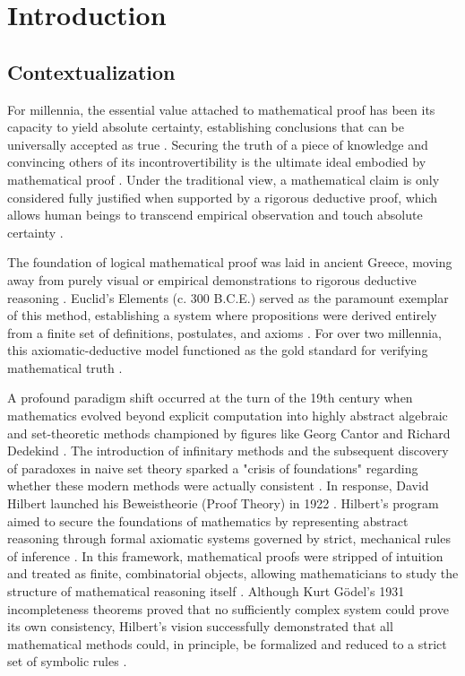 \chapter[Introduction]{Introduction}

\section{Contextualization}

For millennia, the essential value attached to mathematical proof has been its capacity to yield absolute certainty, establishing conclusions that can be universally accepted as true \cite{chemla_history_nodate}. Securing the truth of a piece of knowledge and convincing others of its incontrovertibility is the ultimate ideal embodied by mathematical proof \cite{chemla_history_nodate}. Under the traditional view, a mathematical claim is only considered fully justified when supported by a rigorous deductive proof, which allows human beings to transcend empirical observation and touch absolute certainty \cite{de_toffoli_proofs_2024}.

The foundation of logical mathematical proof was laid in ancient Greece, moving away from purely visual or empirical demonstrations to rigorous deductive reasoning \cite{hanna_proof_2012}. Euclid’s Elements (c. 300 B.C.E.) served as the paramount exemplar of this method, establishing a system where propositions were derived entirely from a finite set of definitions, postulates, and axioms \cite{hanna_proof_2012}. For over two millennia, this axiomatic-deductive model functioned as the gold standard for verifying mathematical truth \cite{hanna_proof_2012}.

A profound paradigm shift occurred at the turn of the 19th century when mathematics evolved beyond explicit computation into highly abstract algebraic and set-theoretic methods championed by figures like Georg Cantor and Richard Dedekind \cite{avigad_proof_2017}. The introduction of infinitary methods and the subsequent discovery of paradoxes in naive set theory sparked a "crisis of foundations" regarding whether these modern methods were actually consistent \cite{avigad_proof_2017}. In response, David Hilbert launched his Beweistheorie (Proof Theory) in 1922 \cite{avigad_proof_2017}. Hilbert’s program aimed to secure the foundations of mathematics by representing abstract reasoning through formal axiomatic systems governed by strict, mechanical rules of inference \cite{avigad_proof_2017}. In this framework, mathematical proofs were stripped of intuition and treated as finite, combinatorial objects, allowing mathematicians to study the structure of mathematical reasoning itself \cite{avigad_proof_2017}. Although Kurt Gödel’s 1931 incompleteness theorems proved that no sufficiently complex system could prove its own consistency, Hilbert’s vision successfully demonstrated that all mathematical methods could, in principle, be formalized and reduced to a strict set of symbolic rules \cite{avigad_proof_2017, avigad_mathematics_2024}.

